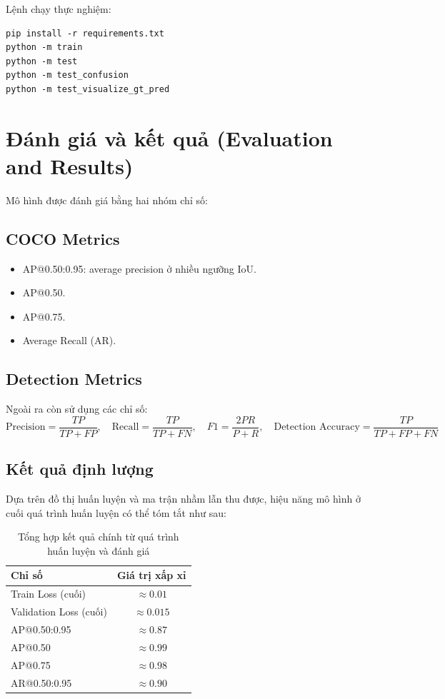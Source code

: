 \documentclass[12pt,a4paper]{article}
\begin{document}
Lệnh chạy thực nghiệm:
\begin{verbatim}
pip install -r requirements.txt
python -m train
python -m test
python -m test_confusion
python -m test_visualize_gt_pred
\end{verbatim}

\section{Đánh giá và kết quả (Evaluation and Results)}

Mô hình được đánh giá bằng hai nhóm chỉ số:

\subsection{COCO Metrics}
\begin{itemize}
    \item AP@0.50:0.95: average precision ở nhiều ngưỡng IoU.
    \item AP@0.50.
    \item AP@0.75.
    \item Average Recall (AR).
\end{itemize}

\subsection{Detection Metrics}
Ngoài ra còn sử dụng các chỉ số:
\[
\text{Precision}=\frac{TP}{TP+FP},\quad
\text{Recall}=\frac{TP}{TP+FN},\quad
F1=\frac{2PR}{P+R},\quad
\text{Detection Accuracy}=\frac{TP}{TP+FP+FN}
\]

\subsection{Kết quả định lượng}

Dựa trên đồ thị huấn luyện và ma trận nhầm lẫn thu được, hiệu năng mô hình ở cuối quá trình huấn luyện có thể tóm tắt như sau:

\begin{table}[H]
\centering
\begin{tabular}{|l|c|}
\hline
\textbf{Chỉ số} & \textbf{Giá trị xấp xỉ} \\
\hline
Train Loss (cuối) & $\approx 0.01$ \\
Validation Loss (cuối) & $\approx 0.015$ \\
AP@0.50:0.95 & $\approx 0.87$ \\
AP@0.50 & $\approx 0.99$ \\
AP@0.75 & $\approx 0.98$ \\
AR@0.50:0.95 & $\approx 0.90$ \\
\hline
\end{tabular}
\caption{Tổng hợp kết quả chính từ quá trình huấn luyện và đánh giá}
\end{table}
\end{document}
